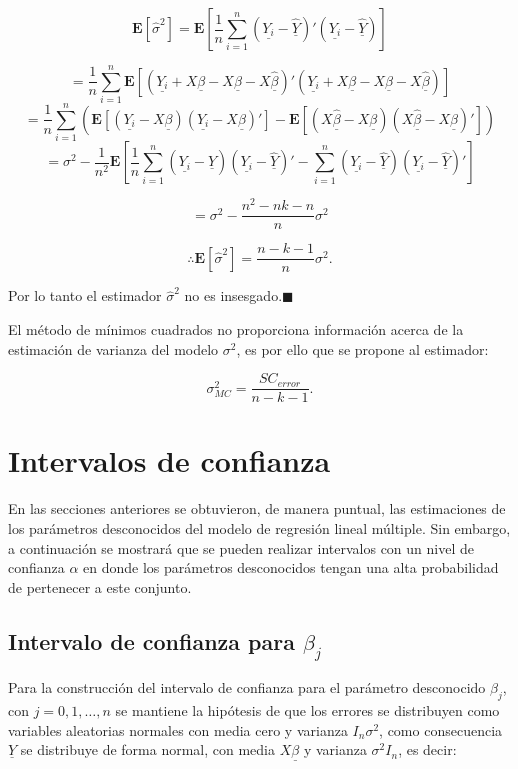\documentclass[a4paper,oneside,openany]{book}
\begin{document}
\[\mathbf{E}[\hat{\sigma}^2]=\mathbf{E}\left[\frac{1}{n}\sum_{i=1}^{n}(\underline{Y_{i}}-\underline{\hat{Y}})'(\underline{Y_{i}}-\underline{\hat{Y}}) \right]\]

\[=\frac{1}{n}\sum_{i=1}^{n}\mathbf{E}\left[(\underline{Y_{i}}+X\underline{\beta}-X\underline{\beta}-X\underline{\hat{\beta}})'(\underline{Y_{i}}+X\underline{\beta}-X\underline{\beta}-X\underline{\hat{\beta}}) \right]\]
\[=\frac{1}{n}\sum_{i=1}^{n}\left(\mathbf{E}[(\underline{Y_{i}}-X\underline{\beta})(\underline{Y_{i}}-X\underline{\beta})']-\mathbf{E}\left[(X\underline{\hat{\beta}}-X\underline{\beta})(X\underline{\hat{\beta}}-X\underline{\beta})'\right] \right)\]
\[=\sigma^2-\frac{1}{n^2}\mathbf{E}\left[\frac{1}{n}\sum_{i=1}^{n}(\underline{Y_{i}}-\underline{\hat{Y}})(\underline{Y_{i}}-\underline{\hat{Y}})'-\sum_{i=1}^{n}(\underline{Y_{i}}-\underline{\hat{Y}})(\underline{Y_{i}}-\underline{\hat{Y}})'\right]\]

\[=\sigma^2-\frac{n^2-nk-n}{n}\sigma^2\]

\[\therefore \mathbf{E}[\hat{\sigma}^2]=\frac{n-k-1}{n}\sigma^2.\]

Por lo tanto el estimador \(\hat{\sigma}^2\) no es
insesgado.\(\blacksquare\)

El método de mínimos cuadrados no proporciona información acerca de la
estimación de varianza del modelo \(\sigma^2\), es por ello que se
propone al estimador:

\[\sigma^2_{MC}=\frac{SC_{error}}{n-k-1}.\]

\section{Intervalos de confianza}\label{intervalos-de-confianza-2}

En las secciones anteriores se obtuvieron, de manera puntual, las
estimaciones de los parámetros desconocidos del modelo de regresión
lineal múltiple. Sin embargo, a continuación se mostrará que se pueden
realizar intervalos con un nivel de confianza \(\alpha\) en donde los
parámetros desconocidos tengan una alta probabilidad de pertenecer a
este conjunto.

\subsection{\texorpdfstring{Intervalo de confianza para
\(\beta_{j}\)}{Intervalo de confianza para \textbackslash{}beta\_\{j\}}}\label{intervalo-de-confianza-para-beta_j}

Para la construcción del intervalo de confianza para el parámetro
desconocido \(\beta_{j}\), con \(j=0,1,\ldots,n\) se mantiene la
hipótesis de que los errores se distribuyen como variables aleatorias
normales con media cero y varianza \(I_{n}\sigma^2\), como consecuencia
\(\underline{Y}\) se distribuye de forma normal, con media
\(X\underline{\beta}\) y varianza \(\sigma^2 I_{n}\), es decir:
\end{document}

